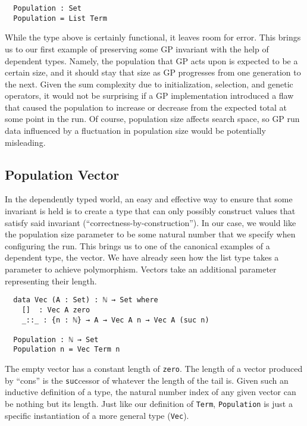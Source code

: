 \documentclass[runningheads,a4paper]{llncs}
\begin{document}
\begin{verbatim}
  Population : Set
  Population = List Term
\end{verbatim}

While the type above is certainly functional, it leaves room for
error. This brings us to our first example of preserving some GP
invariant with the help of dependent types. Namely, the population
that GP acts upon is expected to be a certain size, and it should stay
that size as GP progresses from one generation to the next. Given the
sum complexity due to initialization, selection, and genetic
operators, it would not be surprising if a GP implementation introduced a flaw
that caused the population to increase or decrease from the expected total
at some point in the run. Of course, population size affects search
space, so GP run data influenced by a fluctuation in population size would be
potentially misleading.

\subsection{Population Vector}

In the dependently typed world, an easy and effective way to ensure
that some invariant is held is to create a type that can only possibly
construct values that satisfy said invariant
(``correctness-by-construction''). In our case, we would
like the population size parameter to be some natural number
that we specify when configuring the run. This brings us to one of
the canonical examples of a dependent type, the vector. We have
already seen how the list type takes a parameter to achieve
polymorphism. Vectors take an additional parameter representing their
length.

\begin{verbatim}
  data Vec (A : Set) : ℕ → Set where
    []  : Vec A zero
    _::_ : {n : ℕ} → A → Vec A n → Vec A (suc n)

  Population : ℕ → Set
  Population n = Vec Term n
\end{verbatim}

The empty vector has a constant length of \texttt{zero}. The length of a vector
produced by ``cons'' is the \texttt{suc}cessor of whatever the length of
the tail is. Given such an inductive definition of a type, the natural
number index of any given vector can be nothing but its length. Just
like our definition of \texttt{Term}, \texttt{Population} is just a
specific instantiation of a more general type (\texttt{Vec}).
\end{document}
